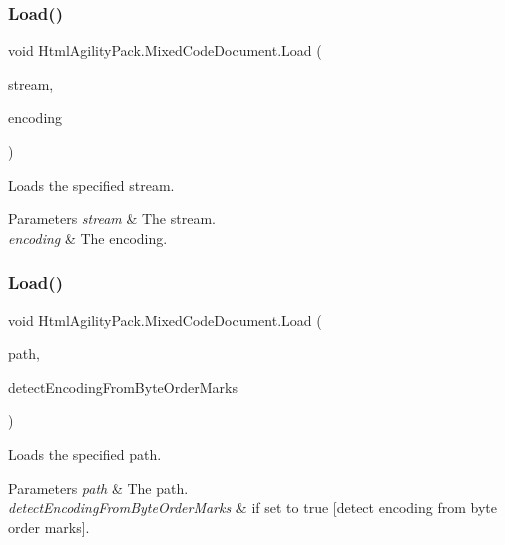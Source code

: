 \subsubsection{\texorpdfstring{Load()}{Load()}\hspace{0.1cm}{\footnotesize\ttfamily [5/11]}}
{\footnotesize\ttfamily void Html\+Agility\+Pack.\+Mixed\+Code\+Document.\+Load (\begin{DoxyParamCaption}\item[{Stream}]{stream,  }\item[{Encoding}]{encoding }\end{DoxyParamCaption})\hspace{0.3cm}{\ttfamily [inline]}}



Loads the specified stream. 


\begin{DoxyParams}{Parameters}
{\em stream} & The stream.\\
\hline
{\em encoding} & The encoding.\\
\hline
\end{DoxyParams}
\mbox{\label{class_html_agility_pack_1_1_mixed_code_document_aea6a823ade2433568bda89678b0281f2}} 
\subsubsection{\texorpdfstring{Load()}{Load()}\hspace{0.1cm}{\footnotesize\ttfamily [6/11]}}
{\footnotesize\ttfamily void Html\+Agility\+Pack.\+Mixed\+Code\+Document.\+Load (\begin{DoxyParamCaption}\item[{string}]{path,  }\item[{bool}]{detect\+Encoding\+From\+Byte\+Order\+Marks }\end{DoxyParamCaption})\hspace{0.3cm}{\ttfamily [inline]}}



Loads the specified path. 


\begin{DoxyParams}{Parameters}
{\em path} & The path.\\
\hline
{\em detect\+Encoding\+From\+Byte\+Order\+Marks} & if set to {\ttfamily true} \mbox{[}detect encoding from byte order marks\mbox{]}.\\
\hline
\end{DoxyParams}
\mbox{\label{class_html_agility_pack_1_1_mixed_code_document_ae93c8beed86c3ab3de863705ff0562b5}} 
